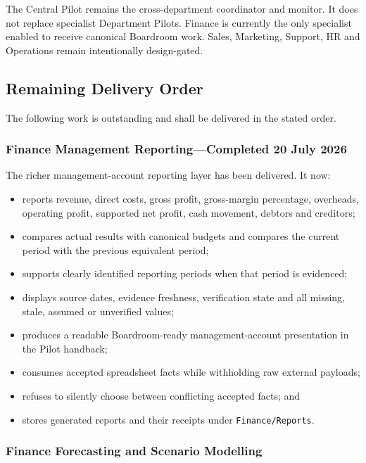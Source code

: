 The Central Pilot remains the cross-department coordinator and monitor.  It does not replace
specialist Department Pilots.  Finance is currently the only specialist enabled to receive
canonical Boardroom work.  Sales, Marketing, Support, HR and Operations remain intentionally
design-gated.

\subsection{Remaining Delivery Order}

The following work is outstanding and shall be delivered in the stated order.

\subsubsection{Finance Management Reporting---Completed 20 July 2026}

The richer management-account reporting layer has been delivered.  It now:

\begin{itemize}
  \item reports revenue, direct costs, gross profit, gross-margin percentage, overheads,
        operating profit, supported net profit, cash movement, debtors and creditors;
  \item compares actual results with canonical budgets and compares the current period with the previous
        equivalent period;
  \item supports clearly identified reporting periods when that period is evidenced;
  \item displays source dates, evidence freshness, verification state and all missing, stale,
        assumed or unverified values;
  \item produces a readable Boardroom-ready management-account presentation in the Pilot handback;
  \item consumes accepted spreadsheet facts while withholding raw external payloads;
  \item refuses to silently choose between conflicting accepted facts; and
  \item stores generated reports and their receipts under \texttt{Finance/Reports}.
\end{itemize}

\subsubsection{Finance Forecasting and Scenario Modelling}

